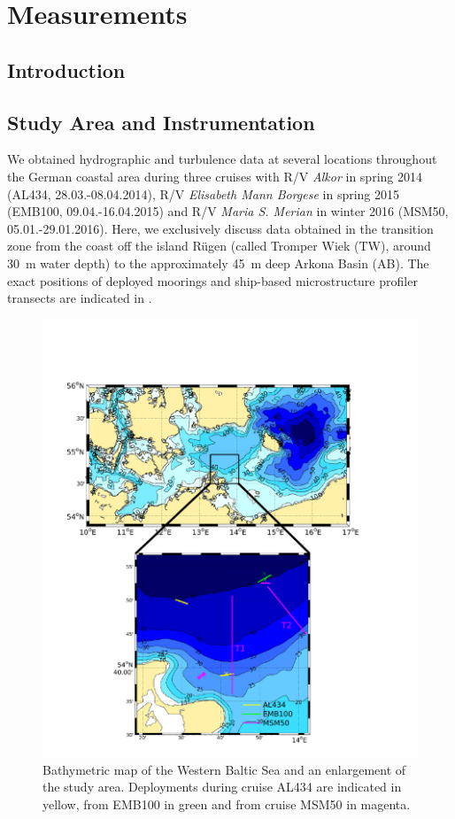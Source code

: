 \chapter{Measurements}
\label{kap-measure}

\section{Introduction}

\section{Study Area and Instrumentation}

We obtained hydrographic and turbulence data at 
several locations throughout the German coastal area during three cruises with 
R/V \textit{Alkor} in spring 2014 (AL434, 28.03.-08.04.2014), R/V 
\textit{Elisabeth Mann Borgese} in spring 2015 (EMB100, 09.04.-16.04.2015) and 
R/V \textit{Maria S. Merian} in winter 2016 (MSM50, 05.01.-29.01.2016). Here, 
we exclusively discuss data obtained in the transition zone from the coast off 
the island R\"{u}gen (called Tromper Wiek (TW), around 30~m water depth) to 
the approximately 45~m deep Arkona Basin (AB). The exact positions of deployed 
moorings and ship-based microstructure profiler transects are indicated in 
.
 \begin{figure}[ht]
 \centering
\includegraphics[width=17cm]{bilder/studyarea.pdf}
 \caption{Bathymetric map of the Western Baltic Sea and an enlargement of the 
study area. Deployments during cruise AL434 are indicated in yellow, from EMB100 
in green and from cruise MSM50 in magenta.}
 \label{studyarea}
 \end{figure}
 
